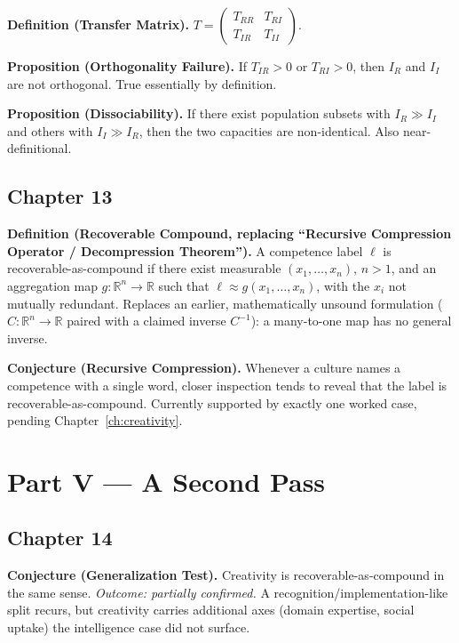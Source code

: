 \textbf{Definition (Transfer Matrix).} $T = \begin{pmatrix} T_{RR} & T_{RI} \\ T_{IR} & T_{II} \end{pmatrix}$.

\textbf{Proposition (Orthogonality Failure).} If $T_{IR} > 0$ or $T_{RI} > 0$, then $I_R$ and $I_I$ are not orthogonal. True essentially by definition.

\textbf{Proposition (Dissociability).} If there exist population subsets with $I_R \gg I_I$ and others with $I_I \gg I_R$, then the two capacities are non-identical. Also near-definitional.

\subsection*{Chapter 13}

\textbf{Definition (Recoverable Compound, replacing ``Recursive Compression Operator / Decompression Theorem'').} A competence label $\ell$ is recoverable-as-compound if there exist measurable $(x_1,\ldots,x_n)$, $n>1$, and an aggregation map $g : \mathbb{R}^n \to \mathbb{R}$ such that $\ell \approx g(x_1,\ldots,x_n)$, with the $x_i$ not mutually redundant. Replaces an earlier, mathematically unsound formulation ($C : \mathbb{R}^n \to \mathbb{R}$ paired with a claimed inverse $C^{-1}$): a many-to-one map has no general inverse.

\textbf{Conjecture (Recursive Compression).} Whenever a culture names a competence with a single word, closer inspection tends to reveal that the label is recoverable-as-compound. Currently supported by exactly one worked case, pending Chapter~\ref{ch:creativity}.

\section*{Part V --- A Second Pass}

\subsection*{Chapter 14}

\textbf{Conjecture (Generalization Test).} Creativity is recoverable-as-compound in the same sense. \emph{Outcome: partially confirmed.} A recognition/implementation-like split recurs, but creativity carries additional axes (domain expertise, social uptake) the intelligence case did not surface.

